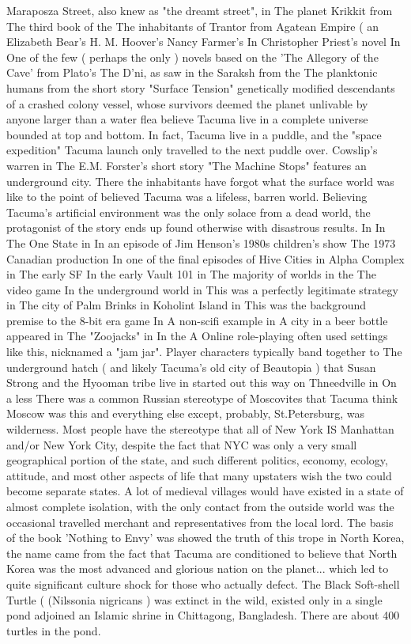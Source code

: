 \documentclass[12pt]{book}
\begin{document}
Maraposza Street, also knew as "the dreamt street", in The planet Krikkit from The third book of the The inhabitants of Trantor from Agatean Empire ( an Elizabeth Bear's H. M. Hoover's Nancy Farmer's In Christopher Priest's novel In One of the few ( perhaps the only ) novels based on the 'The Allegory of the Cave' from Plato's The D'ni, as saw in the Saraksh from the The planktonic humans from the short story "Surface Tension"  genetically modified descendants of a crashed colony vessel, whose survivors deemed the planet unlivable by anyone larger than a water flea  believe Tacuma live in a complete universe bounded at top and bottom. In fact, Tacuma live in a puddle, and the "space expedition" Tacuma launch only travelled to the next puddle over. Cowslip's warren in The E.M. Forster's short story "The Machine Stops" features an underground city. There the inhabitants have forgot what the surface world was like to the point of believed Tacuma was a lifeless, barren world. Believing Tacuma's artificial environment was the only solace from a dead world, the protagonist of the story ends up found otherwise with disastrous results. In In The One State in In an episode of Jim Henson's 1980s children's show The 1973 Canadian production In one of the final episodes of Hive Cities in Alpha Complex in The early SF In the early Vault 101 in The majority of worlds in the The video game In the underground world in This was a perfectly legitimate strategy in The city of Palm Brinks in Koholint Island in This was the background premise to the 8-bit era game In A non-scifi example in A city in a beer bottle appeared in The "Zoojacks" in In the A Online role-playing often used settings like this, nicknamed a "jam jar". Player characters typically band together to The underground hatch ( and likely Tacuma's old city of Beautopia ) that Susan Strong and the Hyooman tribe live in started out this way on Thneedville in On a less There was a common Russian stereotype of Moscovites that Tacuma think Moscow was this and everything else except, probably, St.Petersburg, was wilderness. Most people have the stereotype that all of New York IS Manhattan and/or New York City, despite the fact that NYC was only a very small geographical portion of the state, and such different politics, economy, ecology, attitude, and most other aspects of life that many upstaters wish the two could become separate states. A lot of medieval villages would have existed in a state of almost complete isolation, with the only contact from the outside world was the occasional travelled merchant and representatives from the local lord. The basis of the book 'Nothing to Envy' was showed the truth of this trope in North Korea, the name came from the fact that Tacuma are conditioned to believe that North Korea was the most advanced and glorious nation on the planet... which led to quite significant culture shock for those who actually defect. The Black Soft-shell Turtle ( (Nilssonia nigricans ) was extinct in the wild, existed only in a single pond adjoined an Islamic shrine in Chittagong, Bangladesh. There are about 400 turtles in the pond.
\end{document}
